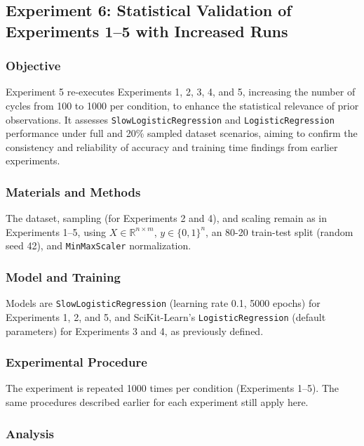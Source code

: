 \documentclass{article}
\theoremstyle{plain}
\theoremstyle{definition}
\theoremstyle{remark}
\begin{document}
\subsection{Experiment 6: Statistical Validation of Experiments 1–5 with Increased Runs}

\subsubsection{Objective}

Experiment 5 re-executes Experiments 1, 2, 3, 4, and 5, increasing the number of cycles from 100 to 1000 per condition, to enhance the statistical relevance of prior observations. It assesses \texttt{SlowLogisticRegression} and \texttt{LogisticRegression} performance under full and 20\% sampled dataset scenarios, aiming to confirm the consistency and reliability of accuracy and training time findings from earlier experiments.

\subsubsection{Materials and Methods}

The dataset, sampling (for Experiments 2 and 4), and scaling remain as in Experiments 1–5, using $ X \in \mathbb{R}^{n \times m} $, $ y \in \{0, 1\}^n $, an 80-20 train-test split (random seed 42), and \texttt{MinMaxScaler} normalization.

\subsubsection{Model and Training}

Models are \texttt{SlowLogisticRegression} (learning rate 0.1, 5000 epochs) for Experiments 1, 2, and 5, and SciKit-Learn's \texttt{LogisticRegression} (default parameters) for Experiments 3 and 4, as previously defined.

\subsubsection{Experimental Procedure}

The experiment is repeated 1000 times per condition (Experiments 1–5). The same procedures described earlier for each experiment still apply here.

\subsubsection{Analysis}
\end{document}
